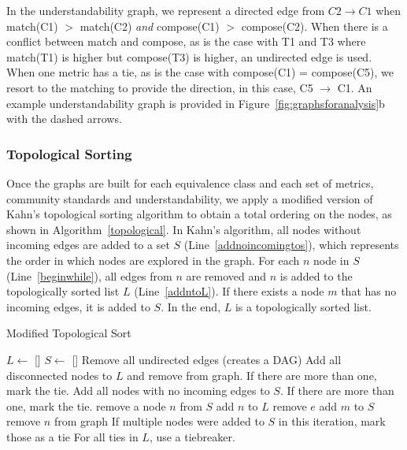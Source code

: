 In the understandability graph, we represent a directed edge from $C2 \rightarrow C1$ when match(C1) $>$ match(C2) \emph{and} compose(C1) $>$ compose(C2). When there is a conflict between match and compose, as is the case with T1 and T3 where match(T1) is higher but compose(T3) is higher, an undirected edge is used. When one metric has a tie, as is the case with compose(C1) = compose(C5), we resort to the matching to provide the direction, in this case, C5 $\rightarrow$ C1. An example understandability graph is provided in Figure~\ref{fig:graphsforanalysis}b with the dashed arrows.

\subsubsection{Topological Sorting}
Once the graphs are built for each equivalence class and each set of metrics, community standards and understandability, we apply a modified version of Kahn's topological sorting algorithm to obtain a total ordering on the nodes, as shown in Algorithm~\ref{topological}. In Kahn's algorithm, all nodes without incoming edges are added to a set $S$ (Line~\ref{addnoincomingtos}), which represents the order in which nodes are explored in the graph. For each $n$ node in $S$ (Line~\ref{beginwhile}), all edges from $n$ are removed and $n$ is added to the topologically sorted list $L$ (Line~\ref{addntoL}). If there exists a node $m$ that has no incoming edges, it is added to $S$.  In the end, $L$ is a topologically sorted list.

\begin{algorithm}
  \caption{Modified Topological Sort}\label{topological}
  \begin{algorithmic}[1]
\State  $L \gets$ []
\State $S \gets$ []
\State Remove all undirected edges (creates a DAG)
\State Add all disconnected nodes to $L$ and remove from graph. If there are more than one, mark the tie. \label{markTie1}
\State Add all nodes with no incoming edges to $S$. If there are more than one, mark the tie. \label{addnoincomingtos}
 \label{beginwhile}
	\State remove a node $n$ from $S$ \label{setn}
	\State add $n$ to $L$  \label{addntoL}
		\State remove $e$
			\State add $m$ to $S$ \label{addToS}
		\EndIf
	\EndFor
	\State remove $n$ from graph
	\State If multiple nodes were added to $S$ in this iteration, mark those as a tie \label{markTie2}
\EndWhile
\State For all ties in $L$, use a tiebreaker.
  \end{algorithmic}
\end{algorithm}

